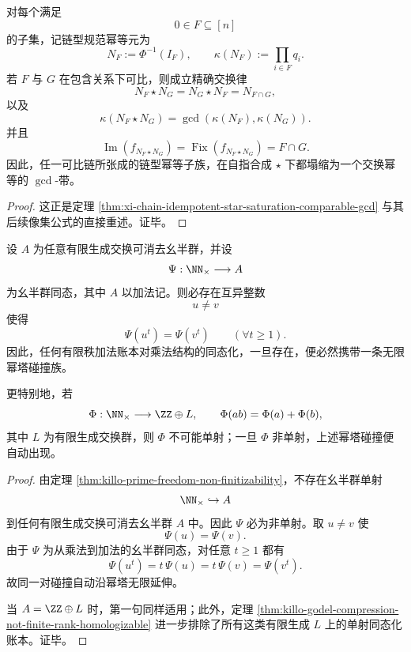 \begin{theorem}\label{thm:conclusion-prime-register-comparable-idempotent-gcd-band}
对每个满足
\[
0\in F\subseteq[n]
\]
的子集，记链型规范幂等元为
\[
N_F:=\Phi^{-1}(I_F),
\qquad
\kappa(N_F):=\prod_{i\in F}q_i.
\]
若 \(F\) 与 \(G\) 在包含关系下可比，则成立精确交换律
\[
N_F\star N_G=N_G\star N_F=N_{F\cap G},
\]
以及
\[
\kappa(N_F\star N_G)=\gcd(\kappa(N_F),\kappa(N_G)).
\]
并且
\[
\operatorname{Im}(f_{N_F\star N_G})
=
\operatorname{Fix}(f_{N_F\star N_G})
=
F\cap G.
\]
因此，任一可比链所张成的链型幂等子族，在自指合成 \(\star\) 下都塌缩为一个交换幂等的 \(\gcd\)-带。
\end{theorem}
\begin{proof}
这正是定理 \ref{thm:xi-chain-idempotent-star-saturation-comparable-gcd} 与其后续像集公式的直接重述。证毕。
\end{proof}

\begin{theorem}[有限秩加法账本的无限幂塔碰撞]\label{thm:conclusion-finite-rank-additive-ledger-power-tower-collision}
设 \(A\) 为任意有限生成交换可消去幺半群，并设
\[
\Psi:\NN_{\times}\longrightarrow A
\]
为幺半群同态，其中 \(A\) 以加法记。则必存在互异整数
\[
u\neq v
\]
使得
\[
\Psi(u^t)=\Psi(v^t)\qquad (\forall t\ge 1).
\]
因此，任何有限秩加法账本对乘法结构的同态化，一旦存在，便必然携带一条无限幂塔碰撞族。

更特别地，若
\[
\Phi:\NN_{\times}\longrightarrow \ZZ\oplus L,
\qquad
\Phi(ab)=\Phi(a)+\Phi(b),
\]
其中 \(L\) 为有限生成交换群，则 \(\Phi\) 不可能单射；一旦 \(\Phi\) 非单射，上述幂塔碰撞便自动出现。
\end{theorem}
\begin{proof}
由定理 \ref{thm:killo-prime-freedom-non-finitizability}，不存在幺半群单射
\[
\NN_{\times}\hookrightarrow A
\]
到任何有限生成交换可消去幺半群 \(A\) 中。因此 \(\Psi\) 必为非单射。取 \(u\neq v\) 使
\[
\Psi(u)=\Psi(v).
\]
由于 \(\Psi\) 为从乘法到加法的幺半群同态，对任意 \(t\ge 1\) 都有
\[
\Psi(u^t)=t\,\Psi(u)=t\,\Psi(v)=\Psi(v^t).
\]
故同一对碰撞自动沿幂塔无限延伸。

当 \(A=\ZZ\oplus L\) 时，第一句同样适用；此外，定理 \ref{thm:killo-godel-compression-not-finite-rank-homologizable} 进一步排除了所有这类有限生成 \(L\) 上的单射同态化账本。证毕。
\end{proof}

